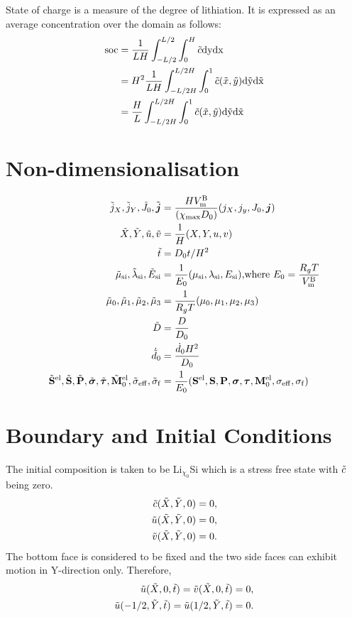 State of charge is a measure of the degree of lithiation. It is expressed as an average concentration over the domain as follows:
\begin{align}
    \rm{soc} &= \frac{1}{LH}\int_{-L/2}^{L/2} \int_0^H \tilde{c} \rm{d}y \rm{d}x  \nonumber \\
         &= H^2\frac{1}{LH} \int_{-L/2H}^{L/2H} \int_0^1 \tilde{c}(\tilde{x}, \tilde{y}) \rm{d}\tilde{y} \rm{d}\tilde{x} \nonumber \\
         &= \frac{H}{L}\int_{-L/2H}^{L/2H} \int_0^1 \tilde{c}(\tilde{x}, \tilde{y}) \rm{d}\tilde{y} \rm{d}\tilde{x} 
\end{align}

\section{Non-dimensionalisation}
\begin{align}
    \tilde{j}_X, \tilde{j}_Y, \tilde{J}_0, \tilde{\bm{j}} &=  \frac{H V_{\rm{m}}^{\rm{B}}}{(\chi_{{\rm{max}}} D_0)} (j_X, j_y, J_0, \bm{j}) \\
    \tilde{X}, \tilde{Y}, \tilde{u}, \tilde{v} &= \frac{1}{H}(X, Y, u, v) \\
    \tilde{t} &= D_0 t/H^2 \\
     \tilde{\mu}_{\text{si}}, \tilde{\lambda}_{\text{si}}, \tilde{E}_{\text{si}} &= \frac{1}{E_0} (\mu_{\text{si}}, \lambda_{\text{si}}, E_{\text{si}}) 
     \text{,where }  E_0 = \frac{R_g T}{V_{\rm{m}}^{\rm{B}}} \\
     \tilde{\mu}_0, \tilde{\mu}_1, \tilde{\mu}_2, \tilde{\mu}_3 &= \frac{1}{R_g T}(\mu_0, \mu_1, \mu_2, \mu_3) \\
     \tilde{D} &= \frac{D}{D_0} \\
     \dot{\tilde{d}}_{0} &= \frac{{\dot{d}}_0 H^2}{D_0} \\
     \tilde{\mathbf{S}}^{{\rm{el}}}, \tilde{\mathbf{S}}, \tilde{\mathbf{P}}, \tilde{\bm{\sigma}}, \tilde{\bm{\tau}}, \tilde{\mathbf{M}}^{{\rm{el}}}_{0}, \tilde{\sigma}_{\rm{eff}}, \tilde{\sigma}_{\rm{f}} &= \frac{1}{E_0}(\mathbf{S}^{{\rm{el}}}, \mathbf{S}, \mathbf{P}, \bm{\sigma}, \bm{\tau}, \mathbf{M}^{{\rm{el}}}_{0}, \sigma_{\rm{eff}}, \sigma_{\rm{f}})
\end{align}


\section{Boundary and Initial Conditions}
The initial composition is taken to be Li$_{\chi_{0}}$Si which is a stress free state with $\tilde{c}$ being zero.
\begin{align}
    \tilde{c}(\tilde{X}, \tilde{Y}, 0) = 0, \\
    \tilde{u}(\tilde{X}, \tilde{Y}, 0) = 0,\\
    \tilde{v}(\tilde{X}, \tilde{Y}, 0) = 0.
\end{align}
\clearpage
The bottom face is considered to be fixed and the two side faces can exhibit motion in Y-direction only. Therefore,
\begin{align}
    \tilde{u}(\tilde{X}, 0, \tilde{t}) = \tilde{v}(\tilde{X}, 0, \tilde{t}) = 0, \\
    \tilde{u}(-1/2, \tilde{Y}, \tilde{t}) =  \tilde{u}(1/2, \tilde{Y}, \tilde{t}) = 0.
\end{align}

